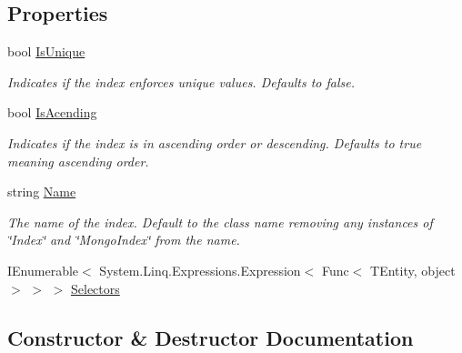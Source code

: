 \subsection*{Properties}
\begin{DoxyCompactItemize}
\item 
bool \hyperlink{classCqrs_1_1Mongo_1_1DataStores_1_1Indexes_1_1MongoIndex_a22720bf0b6c1ea7b910dd7e0bf0475d3}{Is\+Unique}
\begin{DoxyCompactList}\small\item\em Indicates if the index enforces unique values. Defaults to false. \end{DoxyCompactList}\item 
bool \hyperlink{classCqrs_1_1Mongo_1_1DataStores_1_1Indexes_1_1MongoIndex_a59cbfafa9c0a32a8f9befddc3fb3956b}{Is\+Acending}
\begin{DoxyCompactList}\small\item\em Indicates if the index is in ascending order or descending. Defaults to true meaning ascending order. \end{DoxyCompactList}\item 
string \hyperlink{classCqrs_1_1Mongo_1_1DataStores_1_1Indexes_1_1MongoIndex_a635b552b98a7638ca3a474e54652fde6}{Name}
\begin{DoxyCompactList}\small\item\em The name of the index. Default to the class name removing any instances of \char`\"{}\+Index\char`\"{} and \char`\"{}\+Mongo\+Index\char`\"{} from the name. \end{DoxyCompactList}\item 
I\+Enumerable$<$ System.\+Linq.\+Expressions.\+Expression$<$ Func$<$ T\+Entity, object $>$ $>$ $>$ \hyperlink{classCqrs_1_1Mongo_1_1DataStores_1_1Indexes_1_1MongoIndex_a43e73501f54becfaee4430a89841055a}{Selectors}
\end{DoxyCompactItemize}


\subsection{Constructor \& Destructor Documentation}
\mbox{\label{classCqrs_1_1Mongo_1_1DataStores_1_1Indexes_1_1MongoIndex_a7affbb063520cd8c8bda27f8478efd06}} 
